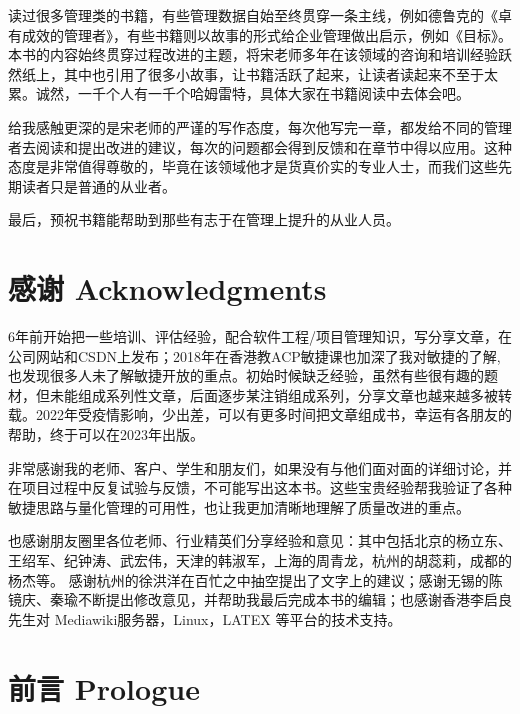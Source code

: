 \documentclass{book}        %
\providecommand{\tightlist}{%
  \setlength{\itemsep}{0pt}\setlength{\parskip}{0pt}}
\begin{document}
读过很多管理类的书籍，有些管理数据自始至终贯穿一条主线，例如德鲁克的《卓有成效的管理者》，有些书籍则以故事的形式给企业管理做出启示，例如《目标》。本书的内容始终贯穿过程改进的主题，将宋老师多年在该领域的咨询和培训经验跃然纸上，其中也引用了很多小故事，让书籍活跃了起来，让读者读起来不至于太累。诚然，一千个人有一千个哈姆雷特，具体大家在书籍阅读中去体会吧。

给我感触更深的是宋老师的严谨的写作态度，每次他写完一章，都发给不同的管理者去阅读和提出改进的建议，每次的问题都会得到反馈和在章节中得以应用。这种态度是非常值得尊敬的，毕竟在该领域他才是货真价实的专业人士，而我们这些先期读者只是普通的从业者。

最后，预祝书籍能帮助到那些有志于在管理上提升的从业人员。

\begin{description}
\item[]
\end{description}


\chapter*{感谢 Acknowledgments } %

6年前开始把一些培训、评估经验，配合软件工程/项目管理知识，写分享文章，在公司网站和CSDN上发布；2018年在香港教ACP敏捷课也加深了我对敏捷的了解,也发现很多人未了解敏捷开放的重点。初始时候缺乏经验，虽然有些很有趣的题材，但未能组成系列性文章，后面逐步某注销组成系列，分享文章也越来越多被转载。2022年受疫情影响，少出差，可以有更多时间把文章组成书，幸运有各朋友的帮助，终于可以在2023年出版。

非常感谢我的老师、客户、学生和朋友们，如果没有与他们面对面的详细讨论，并在项目过程中反复试验与反馈，不可能写出这本书。这些宝贵经验帮我验证了各种敏捷思路与量化管理的可用性，也让我更加清晰地理解了质量改进的重点。

也感谢朋友圈里各位老师、行业精英们分享经验和意见：其中包括北京的杨立东、王绍军、纪钟涛、武宏伟，天津的韩淑军，上海的周青龙，杭州的胡蕊莉，成都的杨杰等。
感谢杭州的徐洪洋在百忙之中抽空提出了文字上的建议；感谢无锡的陈镜庆、秦瑜不断提出修改意见，并帮助我最后完成本书的编辑；也感谢香港李启良先生对
Mediawiki服务器，Linux，LATEX 等平台的技术支持。


\chapter*{前言 Prologue} %
\end{document}
